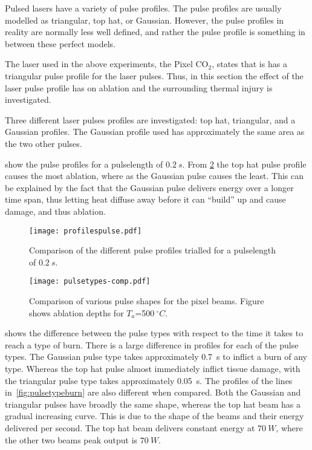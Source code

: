 Pulsed lasers have a variety of pulse profiles.
The pulse profiles are usually modelled as triangular, top hat, or Gaussian.
However, the pulse profiles in reality are normally less well defined, and rather the pulse profile is something in between these perfect models.

The laser used in the above experiments, the Pixel CO$_2$, states that is has a triangular pulse profile for the laser pulses.
Thus, in this section the effect of the laser pulse profile has on ablation and the surrounding thermal injury is investigated.

Three different laser pulses profiles are investigated: top hat, triangular, and a Gaussian profiles.
The Gaussian profile used has approximately the same area as the two other pulses.

 show the pulse profiles for a pulselength of $0.2~s$.
From \cref{fig:comparepulsetypes} the top hat pulse profile causes the most ablation, where as the Gaussian pulse causes the least.
This can be explained by the fact that the Gaussian pulse delivers energy over a longer time span, thus letting heat diffuse away before it can ``build'' up and cause damage, and thus ablation.

\begin{figure}[!htbp]
	\centering
	\texttt{[image: profilespulse.pdf]}
	\caption{Comparison of the different pulse profiles trialled for a pulselength of $0.2~s$.}
	\label{fig:pulseprofiles}
\end{figure}

\begin{figure}[!htbp]
	\centering
	\texttt{[image: pulsetypes-comp.pdf]}
	\caption{Comparison of various pulse shapes for the pixel beams. Figure shows ablation depths for $T_a$=500$~^{\circ}C$.}
	\label{fig:comparepulsetypes}
\end{figure}

 shows the difference between the pulse types with respect to the time it takes to reach a type of burn.
There is a large difference in profiles for each of the pulse types.
The Gaussian pulse type takes approximately 0.7~s to inflict a burn of any type.
Whereas the top hat pulse almost immediately inflict tissue damage, with the triangular pulse type takes approximately 0.05~s.
The profiles of the lines in~\cref{fig:pulsetypeburn} are also different when compared.
Both the Gaussian and triangular pulses have broadly the same shape, whereas the top hat beam has a gradual increasing curve.
This is due to the shape of the beams and their energy delivered per second.
The top hat beam delivers constant energy at $70~W$, where the other two beams peak output is $70~W$.


